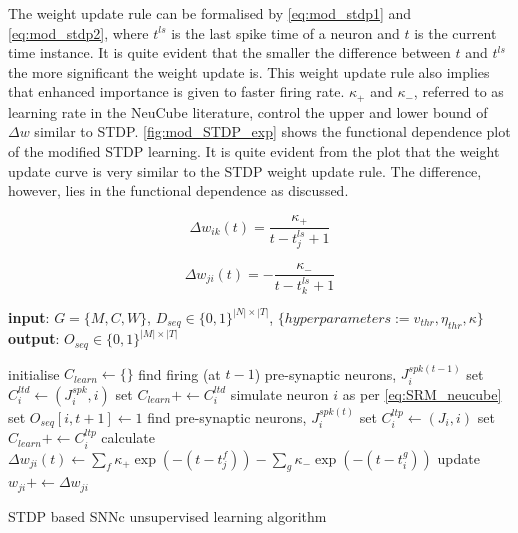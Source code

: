 The weight update rule can be formalised by \equationnames \ref{eq:mod_stdp1} and \ref{eq:mod_stdp2}, where $t^{ls}$ is the last spike time of a neuron and $t$ is the current time instance. It is quite evident that the smaller the difference between $t$ and $t^{ls}$ the more significant the weight update is. This weight update rule also implies that enhanced importance is given to faster firing rate. $\kappa_+$ and $\kappa_-$, referred to as learning rate in the NeuCube literature, control the upper and lower bound of $\Delta w$ similar to STDP. \figurename \ref{fig:mod_STDP_exp} shows the functional dependence plot of the modified STDP learning. It is quite evident from the plot that the weight update curve is very similar to the STDP weight update rule. The difference, however, lies in the functional dependence as discussed. 
   

\begin{equation}
	\Delta w_{ik}(t)=\frac{\kappa_+}{t-t^{ls}_j+1}
	\label{eq:mod_stdp1}
\end{equation}

\begin{equation}
	\Delta w_{ji}(t)=-\frac{\kappa_-}{t-t^{ls}_k+1}
	\label{eq:mod_stdp2}
\end{equation}

\begin{algorithm}
	\begin{algorithmic}[1]
		\STATE \textbf{input}: $G=\{M, C, W\}$, $D_{seq}\in \{0,1\}^{|N|\times |T|}$, $\{hyperparameters:=v_{thr}, \eta_{thr}, \kappa\}$
		\STATE \textbf{output}: $O_{seq} \in \{0, 1\}^{|M|\times |T|}$
		
			\STATE initialise $C_{learn}\leftarrow\{\}$
				\STATE find firing (at $t-1$) pre-synaptic neurons, $J_i^{spk(t-1)}$
				\STATE set $C_i^{ltd}\leftarrow (J_i^{spk}, i)$
				\STATE set $C_{learn}+\leftarrow C_i^{ltd}$
				\STATE simulate neuron $i$ as per \equationname \ref{eq:SRM_neucube}
					\STATE set $O_{seq}[i, t+1]\leftarrow 1$
					\STATE find pre-synaptic neurons, $J_i^{spk(t)}$
					\STATE set $C_i^{ltp}\leftarrow (J_i,i)$
					\STATE set $C_{learn}+\leftarrow C_i^{ltp}$
				\ENDIF
			\ENDFOR
				\STATE calculate $\Delta w_{ji}(t) \leftarrow \sum_f \kappa_+\exp(-(t-t_j^f))-\sum_g \kappa_- \exp(-(t-t_i^g))$
				\STATE update $w_{ji}+\leftarrow \Delta w_{ji}$
			\ENDFOR
		\ENDFOR
		\caption{STDP based SNNc unsupervised learning algorithm}
		\label{alg:unsup_stdp}
	\end{algorithmic}
\end{algorithm}

